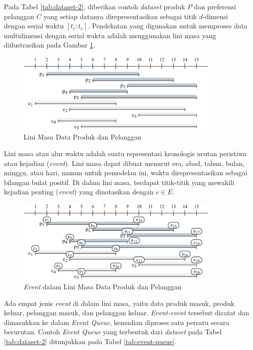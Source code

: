 Pada Tabel \ref{tab:dataset-2}, diberikan contoh \textit{dataset} produk $P$ dan preferensi pelanggan $C$ yang setiap datanya direpresentasikan sebagai titik $d$-dimensi dengan serial waktu $[t_i:t_e]$. Pendekatan yang digunakan untuk memproses data multidimensi dengan serial waktu adalah menggunakan lini masa yang diilustrasikan pada Gambar \ref{fig:timeline}.
\begin{figure}[H]
	\centering
	\includegraphics[width=10cm]{assets/img/bab3/timeline-polos.png}
	\caption{Lini Masa Data Produk dan Pelanggan}
	\label{fig:timeline}
\end{figure}

Lini masa atau alur waktu adalah suatu representasi kronologis urutan peristiwa atau kejadian (\textit{event}). Lini masa dapat dibuat menurut era, abad, tahun, bulan, minggu, atau hari, namun untuk pemodelan ini, waktu direpresentasikan sebagai bilangan bulat positif. Di dalam lini masa, terdapat titik-titik yang mewakili kejadian penting (\textit{event}) yang dinotasikan dengan $e \in E$. 
\begin{figure}[H]
	\centering
	\includegraphics[width=10cm]{assets/img/bab3/timeline-event.png}
	\caption{\textit{Event} dalam Lini Masa Data Produk dan Pelanggan}
	\label{fig:timeline-event}
\end{figure}

\pagebreak
Ada empat jenis \textit{event} di dalam lini masa, yaitu data produk masuk, produk keluar, pelanggan masuk, dan pelanggan keluar. \textit{Event-event} tersebut dicatat dan dimasukkan ke dalam \textit{Event Queue}, kemudian diproses satu persatu secara berurutan. Contoh \textit{Event Queue} yang terbentuk dari \textit{dataset} pada Tabel \ref{tab:dataset-2} ditunjukkan pada Tabel \ref{tab:event-queue}.

